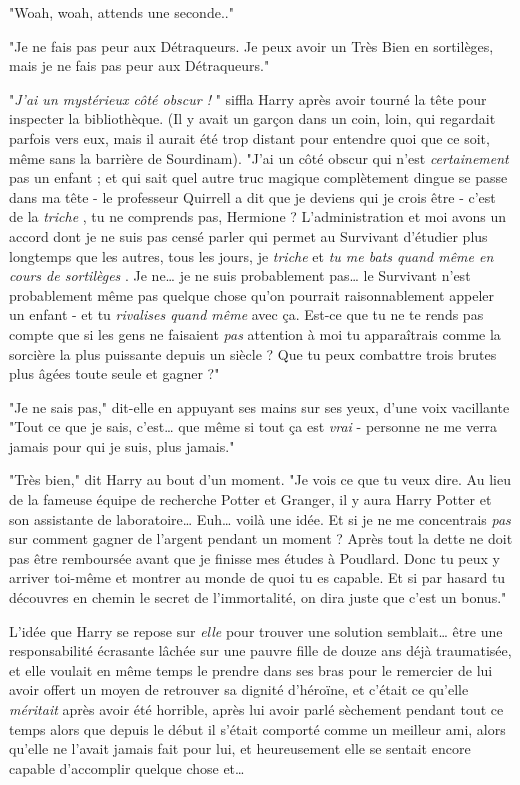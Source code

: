 "Woah, woah, attends une seconde.."

"Je ne fais pas peur aux Détraqueurs. Je peux avoir un Très Bien en sortilèges, mais je ne fais pas peur aux Détraqueurs."

"\emph{J'ai un mystérieux côté obscur !} " siffla Harry après avoir tourné la tête pour inspecter la bibliothèque. (Il y avait un garçon dans un coin, loin, qui regardait parfois vers eux, mais il aurait été trop distant pour entendre quoi que ce soit, même sans la barrière de Sourdinam). "J'ai un côté obscur qui n'est \emph{certainement}  pas un enfant ; et qui sait quel autre truc magique complètement dingue se passe dans ma tête - le professeur Quirrell a dit que je deviens qui je crois être - c'est de la \emph{triche} , tu ne comprends pas, Hermione ? L'administration et moi avons un accord dont je ne suis pas censé parler qui permet au Survivant d'étudier plus longtemps que les autres, tous les jours, je \emph{triche}  et \emph{tu me bats quand même en cours de sortilèges} . Je ne… je ne suis probablement pas… le Survivant n'est probablement même pas quelque chose qu'on pourrait raisonnablement appeler un enfant - et tu \emph{rivalises quand même}  avec ça. Est-ce que tu ne te rends pas compte que si les gens ne faisaient \emph{pas}  attention à moi tu apparaîtrais comme la sorcière la plus puissante depuis un siècle ? Que tu peux combattre trois brutes plus âgées toute seule et gagner ?"

"Je ne sais pas," dit-elle en appuyant ses mains sur ses yeux, d'une voix vacillante "Tout ce que je sais, c'est… que même si tout ça est \emph{vrai}  - personne ne me verra jamais pour qui je suis, plus jamais."

"Très bien," dit Harry au bout d'un moment. "Je vois ce que tu veux dire. Au lieu de la fameuse équipe de recherche Potter et Granger, il y aura Harry Potter et son assistante de laboratoire… Euh… voilà une idée. Et si je ne me concentrais \emph{pas}  sur comment gagner de l'argent pendant un moment ? Après tout la dette ne doit pas être remboursée avant que je finisse mes études à Poudlard. Donc tu peux y arriver toi-même et montrer au monde de quoi tu es capable. Et si par hasard tu découvres en chemin le secret de l'immortalité, on dira juste que c'est un bonus."

L'idée que Harry se repose sur \emph{elle}  pour trouver une solution semblait… être une responsabilité écrasante lâchée sur une pauvre fille de douze ans déjà traumatisée, et elle voulait en même temps le prendre dans ses bras pour le remercier de lui avoir offert un moyen de retrouver sa dignité d'héroïne, et c'était ce qu'elle \emph{méritait}  après avoir été horrible, après lui avoir parlé sèchement pendant tout ce temps alors que depuis le début il s'était comporté comme un meilleur ami, alors qu'elle ne l'avait jamais fait pour lui, et heureusement elle se sentait encore capable d'accomplir quelque chose et…

